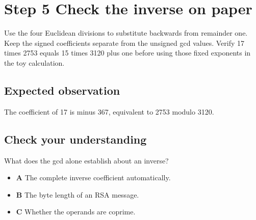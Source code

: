 \section{Step 5 Check the inverse on paper}\label{rsa-s05}

Use the four Euclidean divisions to substitute backwards from remainder one. Keep the signed coefficients separate from the unsigned gcd values. Verify 17 times 2753 equals 15 times 3120 plus one before using those fixed exponents in the toy calculation.

\subsection{Expected observation}
The coefficient of 17 is minus 367, equivalent to 2753 modulo 3120.

\subsection{Check your understanding}
What does the gcd alone establish about an inverse?

\begin{itemize}
  \item \textbf{A} The complete inverse coefficient automatically.
  \item \textbf{B} The byte length of an RSA message.
  \item \textbf{C} Whether the operands are coprime.
\end{itemize}
